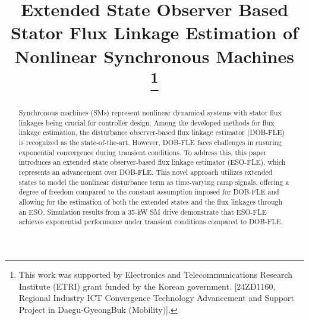 \documentclass[conference]{IEEEtran}
\begin{document}
\title{Extended State Observer Based Stator Flux Linkage Estimation of Nonlinear Synchronous Machines\\
\thanks{This work was supported by Electronics and Telecommunications Research Institute (ETRI) grant funded by the Korean government. [24ZD1160, Regional Industry ICT Convergence Technology Advancement and Support Project in Daegu-GyeongBuk (Mobility)].}
}

\author{
\and
{}
\and
{}
\and
{}
}

\maketitle

\begin{abstract}
Synchronous machines (SMs) represent nonlinear dynamical systems with stator flux linkages being crucial for controller design. Among the developed methods for flux linkage estimation, the disturbance observer-based flux linkage estimator (DOB-FLE) is recognized as the state-of-the-art. However, DOB-FLE faces challenges in ensuring exponential convergence during transient conditions. To address this, this paper introduces an extended state observer-based flux linkage estimator (ESO-FLE), which represents an advancement over DOB-FLE. This novel approach utilizes extended states to model the nonlinear disturbance term as time-varying ramp signals, offering a degree of freedom compared to the constant assumption imposed for DOB-FLE and allowing for the estimation of both the extended states and the flux linkages through an ESO. Simulation results from a 35-kW SM drive demonstrate that ESO-FLE achieves exponential performance under transient conditions compared to DOB-FLE.
\end{abstract}
\end{document}
